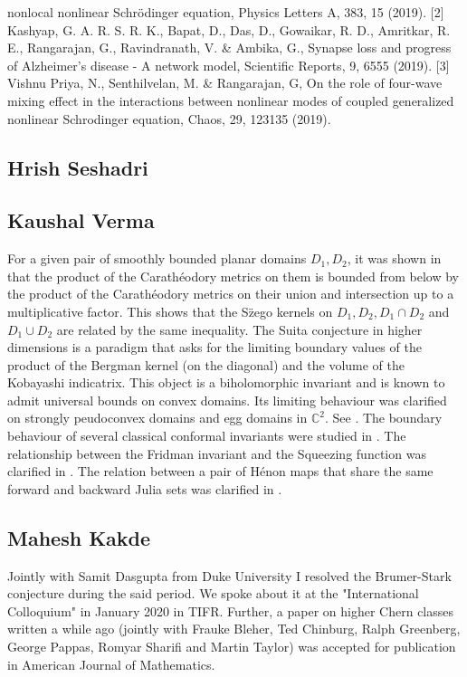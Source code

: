 nonlocal nonlinear Schrödinger equation, Physics Letters A, 383, 15 (2019).   [2] Kashyap, G. A. R. S. R. K., Bapat, D., Das, D., Gowaikar, R. D., Amritkar, R. E., Rangarajan, G., Ravindranath, V. & Ambika, G., Synapse loss and progress of Alzheimer’s disease - A network model, Scientific Reports, 9, 6555 (2019).   [3] Vishnu Priya, N., Senthilvelan, M. &  Rangarajan, G, On the role of four-wave mixing effect in the interactions between nonlinear modes of coupled generalized nonlinear Schrodinger equation, Chaos, 29, 123135 (2019). 


\subsection{Hrish Seshadri}




\subsection{Kaushal Verma}

For a given pair of smoothly bounded planar domains $D_1, D_2$, it was shown in \cite{1} that the product of the Carath\'{e}odory metrics on them is bounded from below by the product of the Carath\'{e}odory metrics on their union and intersection up to a multiplicative factor. This shows that the S\"{z}ego kernels on $D_1, D_2, D_1 \cap D_2$ and $D_1 \cup D_2$ are related by the same inequality.    The Suita conjecture in higher dimensions is a paradigm that asks for the limiting boundary values of the product of the Bergman kernel (on the diagonal) and the volume of the Kobayashi indicatrix. This object is a biholomorphic invariant and is known to admit universal bounds on convex domains. Its limiting behaviour was clarified on strongly peudoconvex domains and egg domains in $\mathbb C^2$. See \cite{2}.  The boundary behaviour of several classical conformal invariants were studied in \cite{3}.  The relationship between the Fridman invariant and the Squeezing function was clarified in \cite{4}.  The relation between a pair of H\'{e}non maps that share the same forward and backward Julia sets was clarified in \cite{5}.


\subsection{Mahesh Kakde}

Jointly with Samit Dasgupta from Duke University I resolved the Brumer-Stark conjecture during the said period. We spoke about it at the "International Colloquium" in January 2020 in TIFR. Further, a paper on higher Chern classes written a while ago (jointly with Frauke Bleher, Ted Chinburg,  Ralph Greenberg, George Pappas, Romyar Sharifi and Martin Taylor) was accepted for publication in American Journal of Mathematics. 


